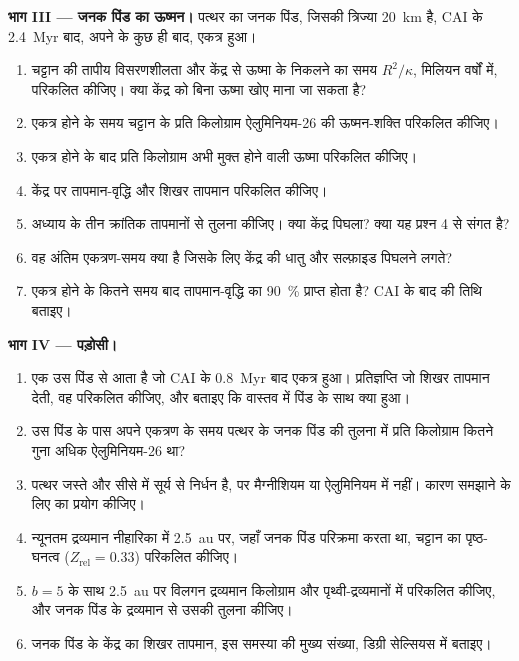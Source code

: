 \begin{problem}
\noindent\textbf{भाग III --- जनक पिंड का ऊष्मन।}
पत्थर का जनक पिंड, जिसकी त्रिज्या \qty{20}{km} है, CAI के \qty{2.4}{Myr} बाद,
अपने  के कुछ ही बाद, एकत्र हुआ।
\begin{enumerate}[resume]
  \item चट्टान की तापीय विसरणशीलता और केंद्र से ऊष्मा के निकलने का समय $R^2/\kappa$,
        मिलियन वर्षों में, परिकलित कीजिए। क्या केंद्र को
        बिना ऊष्मा खोए माना जा सकता है?
  \item एकत्र होने के समय चट्टान के प्रति किलोग्राम ऐलुमिनियम-26 की ऊष्मन-शक्ति
        परिकलित कीजिए।
  \item एकत्र होने के बाद प्रति किलोग्राम अभी मुक्त होने वाली ऊष्मा परिकलित कीजिए।
  \item केंद्र पर तापमान-वृद्धि और शिखर तापमान परिकलित कीजिए।
  \item अध्याय के तीन क्रांतिक तापमानों से तुलना कीजिए। क्या
        केंद्र पिघला? क्या यह प्रश्न 4 से संगत है?
  \item वह अंतिम एकत्रण-समय क्या है जिसके लिए केंद्र की धातु और सल्फ़ाइड
        पिघलने लगते?
  \item एकत्र होने के कितने समय बाद तापमान-वृद्धि का \qty{90}{\percent}
        प्राप्त होता है? CAI के बाद की तिथि बताइए।
\end{enumerate}

\noindent\textbf{भाग IV --- पड़ोसी।}
\begin{enumerate}[resume]
  \item एक  उस पिंड से आता है जो CAI के \qty{0.8}{Myr} बाद
        एकत्र हुआ। प्रतिज्ञप्ति जो शिखर तापमान देती, वह परिकलित कीजिए, और बताइए
        कि वास्तव में पिंड के साथ क्या हुआ।
  \item उस पिंड के पास अपने एकत्रण के समय पत्थर के जनक पिंड की तुलना में प्रति किलोग्राम कितने गुना
        अधिक ऐलुमिनियम-26 था?
  \item पत्थर जस्ते और सीसे में सूर्य से निर्धन है, पर मैग्नीशियम या
        ऐलुमिनियम में नहीं। कारण समझाने के लिए  का प्रयोग कीजिए।
  \item न्यूनतम द्रव्यमान नीहारिका में \qty{2.5}{au} पर, जहाँ जनक पिंड
        परिक्रमा करता था, चट्टान का पृष्ठ-घनत्व
        ($Z_{\mathrm{rel}} = 0.33$) परिकलित कीजिए।
  \item $b = 5$ के साथ \qty{2.5}{au} पर विलगन द्रव्यमान किलोग्राम और
        पृथ्वी-द्रव्यमानों में परिकलित कीजिए, और जनक पिंड के द्रव्यमान से उसकी तुलना कीजिए।
  \item जनक पिंड के केंद्र का शिखर तापमान, इस समस्या की मुख्य संख्या,
        डिग्री सेल्सियस में बताइए।
\end{enumerate}
\end{problem}
